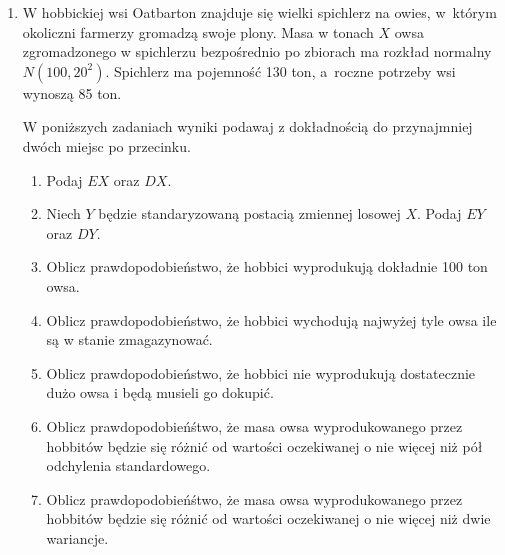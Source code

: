 \documentclass[twoside]{mwart}
\begin{document}
\begin{enumerate}
%
\item W hobbickiej wsi Oatbarton znajduje się wielki spichlerz na owies, w~którym okoliczni farmerzy gromadzą swoje plony.
Masa w tonach $X$ owsa zgromadzonego w spichlerzu bezpośrednio po zbiorach ma rozkład normalny $N(100, 20^2)$.
Spichlerz ma pojemność 130 ton, a~roczne potrzeby wsi wynoszą 85 ton.

W poniższych zadaniach wyniki podawaj z dokładnością do przynajmniej dwóch miejsc po przecinku.
\begin{enumerate}
\item Podaj $EX$ oraz $DX$.
\item Niech $Y$ będzie standaryzowaną postacią zmiennej losowej $X$. Podaj $EY$ oraz $DY$.
\item Oblicz prawdopodobieństwo, że hobbici wyprodukują dokładnie 100 ton owsa.
\item Oblicz prawdopodobieństwo, że hobbici wychodują najwyżej tyle owsa ile są w stanie zmagazynować.
\item Oblicz prawdopodobieństwo, że hobbici nie wyprodukują dostatecznie dużo owsa i będą musieli go dokupić.
\item Oblicz prawdopodobieńśtwo, że masa owsa wyprodukowanego przez hobbitów będzie się różnić od wartości oczekiwanej o nie więcej niż pół odchylenia standardowego.
\item Oblicz prawdopodobieńśtwo, że masa owsa wyprodukowanego przez hobbitów będzie się różnić od wartości oczekiwanej o nie więcej niż dwie wariancje.
\end{enumerate}


\end{enumerate}
\end{document}
